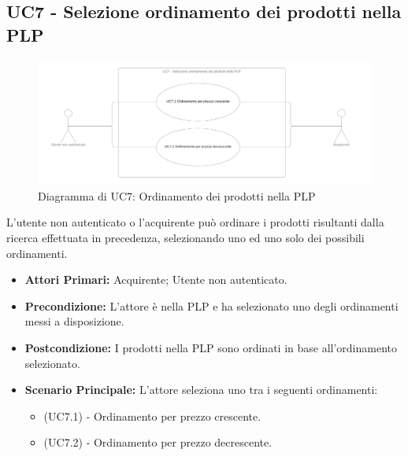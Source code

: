 
\subsection{UC7 - Selezione ordinamento dei prodotti nella PLP} \label{UC7}

\begin{figure}[H]
    \centering
    \includegraphics[width=\textwidth]{Immagini/DiagrammiUC/UC7Ordinamento.png}
    \caption{Diagramma di UC7: Ordinamento dei prodotti nella PLP} 
    \label{fig:Checkout}
\end{figure}

L'utente non autenticato o l'acquirente può ordinare i prodotti risultanti dalla ricerca effettuata in precedenza, selezionando uno ed uno solo dei possibili ordinamenti.
\begin{itemize}
    \item \textbf{Attori Primari:} Acquirente; Utente non autenticato.
    \item \textbf{Precondizione:} L'attore è nella PLP e ha selezionato uno degli ordinamenti messi a disposizione.
    \item \textbf{Postcondizione:} I prodotti nella PLP sono ordinati in base all'ordinamento selezionato.
    \item \textbf{Scenario Principale:} L'attore seleziona uno tra i seguenti ordinamenti:
    \begin{itemize}
        \item (UC7.1) - Ordinamento per prezzo crescente.
        \item (UC7.2) - Ordinamento per prezzo decrescente.
    \end{itemize}
\end{itemize}

